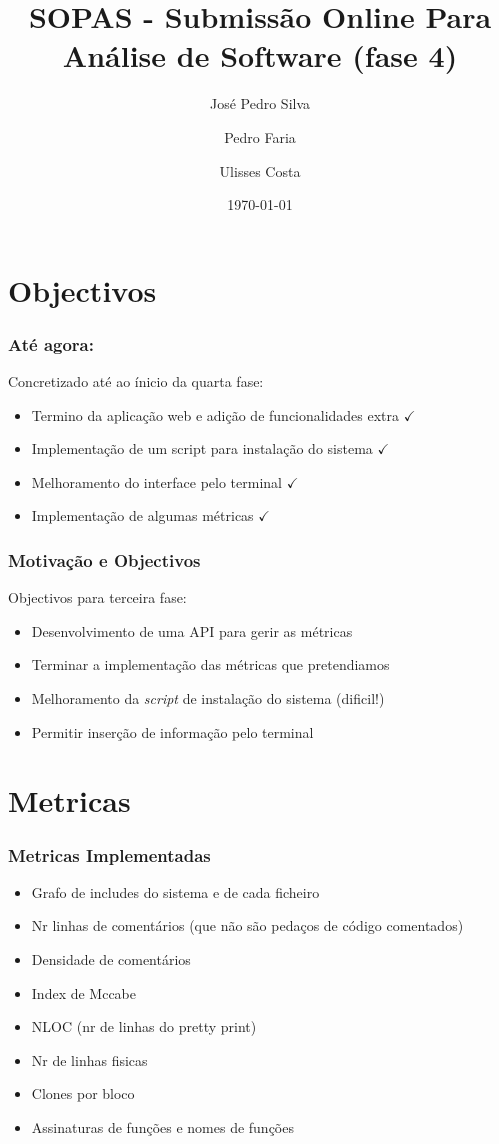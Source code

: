 \documentclass{beamer}
\title{SOPAS - Submissão Online Para Análise de Software (fase 4)}
\author{José Pedro Silva \and
Pedro Faria \and
Ulisses Costa
}
\date{\today}
\institute{Engenharia de Linguagens\\
Projecto integrado
}
\begin{document}
\begin{frame}
   \titlepage
\end{frame}

\section{Objectivos}
\begin{frame} \frametitle{Até agora:}
Concretizado até ao ínicio da quarta fase:
\begin{itemize}
\item Termino da aplicação web e adição de funcionalidades extra {\color{green}$\checkmark$}
\item Implementação de um script para instalação do sistema {\color{green}$\checkmark$}
\item Melhoramento do interface pelo terminal {\color{green}$\checkmark$}
\item Implementação de algumas métricas {\color{green}$\checkmark$}
\end{itemize}
\end{frame}

\begin{frame} \frametitle{Motivação e Objectivos}
Objectivos para terceira fase:
\begin{itemize}
\item Desenvolvimento de uma API para gerir as métricas
\item Terminar a implementação das métricas que pretendiamos
\item Melhoramento da \emph{script} de instalação do sistema (dificil!)
\item Permitir inserção de informação pelo terminal
\end{itemize}
\end{frame}

\section{Metricas}
\begin{frame} \frametitle{Metricas Implementadas}
\begin{itemize}
\item Grafo de includes do sistema e de cada ficheiro
\item Nr linhas de comentários (que não são pedaços de código comentados)
\item Densidade de comentários
\item Index de Mccabe
\item NLOC (nr de linhas do pretty print)
\item Nr de linhas fisicas
\item Clones por bloco
\item Assinaturas de funções e nomes de funções
\end{itemize}
\end{frame}
\end{document}

